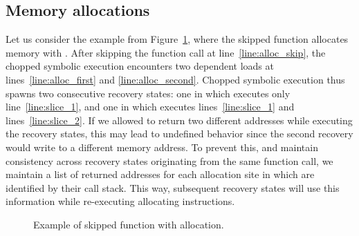 
\subsection{Memory allocations}
\label{Se:Malloc}

Let us consider the example from
Figure~\ref{fig:slices-with-allocations}, where the skipped function
 allocates memory with . After skipping the
function call at line~\ref{line:alloc_skip}, the chopped symbolic
execution encounters two dependent loads at
lines~\ref{line:alloc_first} and \ref{line:alloc_second}. Chopped
symbolic execution thus spawns two consecutive recovery states: one in
which executes only line~\ref{line:slice_1}, and one in which executes lines~\ref{line:slice_1} and
lines~\ref{line:slice_2}. If we allowed  to return two different addresses while
executing the recovery states, this may lead to undefined behavior
since the second recovery would write to a different memory
address. To prevent this, and maintain consistency across recovery
states originating from the same function call, we maintain a list of
returned addresses for each allocation site in  which are
identified by their call stack. This way, subsequent recovery states
will use this information while re-executing allocating instructions.

\begin{figure}[tbp]
  \vspace{-2mm}
  \caption{Example of skipped function with allocation.}\vspace{-4mm}
\label{fig:slices-with-allocations}
\end{figure}

